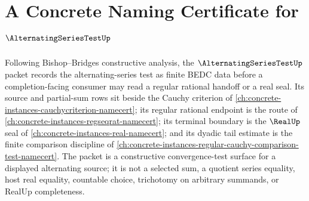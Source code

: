 \chapter{A Concrete Naming Certificate for $\AlternatingSeriesTestUp$}
\label{ch:concrete-instances-alternating-series-test-namecert}

Following Bishop--Bridges constructive analysis, the $\AlternatingSeriesTestUp$ packet records the alternating-series test as finite BEDC data before a completion-facing consumer may read a regular rational handoff or a real seal. Its source and partial-sum rows sit beside the Cauchy criterion of \autoref{ch:concrete-instances-cauchycriterion-namecert}; its regular rational endpoint is the route of \autoref{ch:concrete-instances-regseqrat-namecert}; its terminal boundary is the $\RealUp$ seal of \autoref{ch:concrete-instances-real-namecert}; and its dyadic tail estimate is the finite comparison discipline of \autoref{ch:concrete-instances-regular-cauchy-comparison-test-namecert}. The packet is a constructive convergence-test surface for a displayed alternating source; it is not a selected sum, a quotient series equality, host real equality, countable choice, trichotomy on arbitrary summands, or RealUp completeness.


